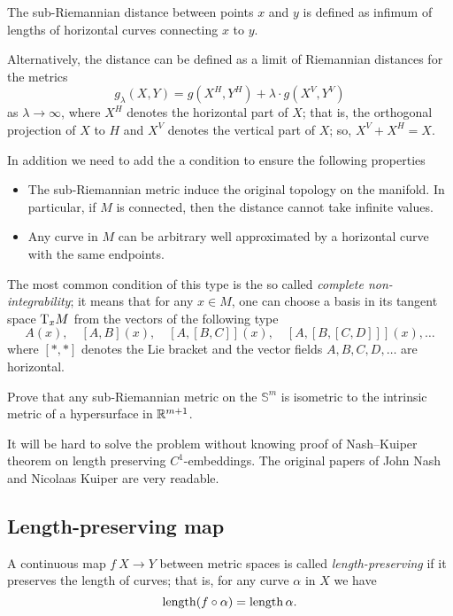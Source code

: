 The sub-Riemannian distance between points $x$ and $y$ is defined as infimum of lengths of horizontal curves connecting $x$ to $y$.

Alternatively, the distance can be defined as a limit of Riemannian distances 
for the metrics 
\[g_\lambda(X,Y)=g(X^H,Y^H)+\lambda\cdot g(X^V,Y^V)\] 
as $\lambda\to \infty$,
where $X^H$ denotes the horizontal part of $X$;
that is, the orthogonal projection of $X$ to $H$
and $X^V$ denotes the vertical part of $X$;
so, $X^V+X^H=X$.

In addition we need to add the a condition to ensure the following properties 
\begin{itemize}
\item The sub-Riemannian metric induce the original topology on the manifold. 
In particular, if $M$ is connected, then the distance cannot take infinite values.
\item Any curve in $M$ can be arbitrary well approximated by a horizontal curve with the same endpoints.
\end{itemize}
The most common condition of this type is the so called {}\emph{complete non-integrability};
it means that for any $x\in M$, 
one can choose a basis in its tangent space $\mathrm{T}_xM$
from the vectors of the following type
\[A(x),\quad  [A,B](x),\quad [A,[B,C]](x),\quad [A,[B,[C,D]]](x),\dots\] 
where $[{*},{*}]$ denotes the Lie bracket 
and the vector fields $A,B,C,D, \dots$ are horizontal.

\begin{pr}
Prove that any sub-Riemannian metric 
on the $\mathbb{S}^m$ is isometric to the intrinsic metric of a hypersurface in $\mathbb{R}^{m+1}$.
\end{pr}


It will be hard to solve the problem without knowing proof of Nash--Kuiper theorem on length preserving $C^1$-embeddings.
The original papers of John Nash 
and Nicolaas Kuiper \cite[see][]{nash,kuiper} are very readable.

\subsection*{Length-preserving map\thm}
\label{two2one} 

A continuous map $f\:X\to Y$ between metric spaces is called \emph{length-preserving} if it preserves the length of curves; 
that is, for any curve $\alpha$ in $X$ we have
\[\operatorname{\rm length}(f\circ\alpha)=\operatorname{\rm length}\alpha.\]

